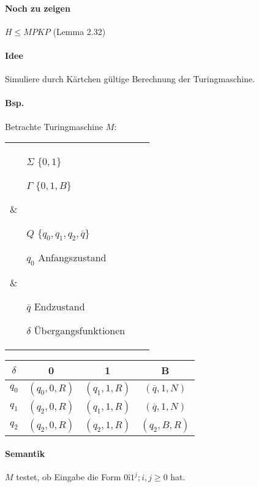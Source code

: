 \paragraph*{Noch zu zeigen} $H \leq MPKP$ (Lemma 2.32)

\paragraph*{Idee} Simuliere durch Kärtchen gültige Berechnung der Turingmaschine.

\paragraph*{Bsp.} Betrachte Turingmaschine $M$:

\begin{tabular}{lll}
\parbox{5cm}{
	\begin{itemize}
		\item[$\Sigma$] $\{ 0,1 \}$
		\item[$\Gamma$] $\{ 0,1,B \}$
	\end{itemize}
} &
\parbox{5cm}{
	\begin{itemize}
	\item[$Q$] $\{ q_0,q_1,q_2,\overline{q} \}$
	\item[$q_0$] Anfangszustand
	\end{itemize}
} &
\parbox{5cm}{
	\begin{itemize}
	\item[$\overline{q}$] Endzustand
	\item[$\delta$] Übergangsfunktionen
	\end{itemize}
}
\end{tabular}

\begin{table}[htb!]
\centering
\begin{tabular}{c|c c c}
$\delta$ & 0 & 1 & B \\
\hline
$q_0$ & $(q_0,0,R)$ & $(q_1,1,R)$ & $(\overline{q},1,N)$ \\
$q_1$ & $(q_2,0,R)$ & $(q_1,1,R)$ & $(\overline{q},1,N)$ \\
$q_2$ & $(q_2,0,R)$ & $(q_2,1,R)$ & $(q_2,B,R)$ \\
\end{tabular}
\end{table}

\paragraph*{Semantik} $M$ testet, ob Eingabe die Form $0î1^j;i,j \geq 0$ hat.

